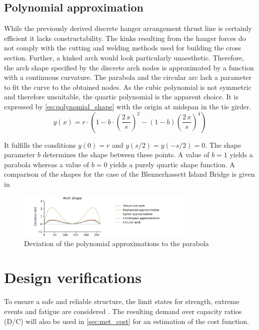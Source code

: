 \subsection{Polynomial approximation} \label{sec:polynomial_approximation}
While the previously derived discrete hanger arrangement thrust line is certainly efficient it lacks constructability. The kinks resulting from the hanger forces do not comply with the cutting and welding methods used for building the cross section. Further, a kinked arch would look particularly unaesthetic. Therefore, the arch shape specified by the discrete arch nodes is approximated by a function with a continuous curvature. The parabola and the circular arc lack a parameter to fit the curve to the obtained nodes. As the cubic polynomial is not symmetric and therefore unsuitable, the quartic polynomial is the apparent choice. It is expressed by \cref{eq:polynomial_shape} with the origin at midspan in the tie girder.
\begin{equation}
    y(x)=r \cdot \left(1 - b \cdot \left(\frac{2\,x}{s}\right)^2 - (1-b) \left(\frac{2\,x}{s}\right)^4 \right)
    \label{eq:polynomial_shape}
\end{equation}

It fulfills the conditions $y(0)=r$ and $y(s/2)=y(-s/2)=0$. The shape parameter $b$ determines the shape between these points. A value of $b=1$ yields a parabola whereas a value of $b=0$ yields a purely quartic shape function. A comparison of the shapes for the case of the Blennerhassett Island Bridge is given in 

\begin{figure}[H]
    \centering
    \includegraphics[trim={1cm 0 3cm 0},clip, width=0.76\textwidth]{calculations/arch shape/arch_shapes_13.png}
    \caption{Deviation of the polynomial approximations to the parabola}
    \label{fig:arch_shapes_13}
\end{figure}

\newpage
\section{Design verifications} \label{sec:met_ver}
To ensure a safe and reliable structure, the limit states for strength, extreme events and fatigue are considered \cite{AASHTO}.  The resulting demand over capacity ratios (D/C) will also be used in \cref{sec:met_cost} for an estimation of the cost function.

